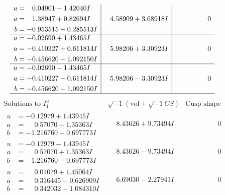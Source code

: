 \documentclass[1p]{elsarticle_modified}
\theoremstyle{definition}
\newcommand{\I}{\sqrt{-1}}
\begin{document}
$$\begin{array}{c|c|c}
\begin{aligned}
u &= \phantom{-}0.04901 - 1.42040 I \\
a &= \phantom{-}1.38947 + 0.82694 I \\
b &= -0.953515 + 0.285513 I\end{aligned}
 & \phantom{-}4.58909 + 3.68918 I & \phantom{-0.000000 } 0 \\ \hline\begin{aligned}
u &= -0.02690 + 1.43465 I \\
a &= -0.410227 + 0.611814 I \\
b &= -0.456620 + 1.092150 I\end{aligned}
 & \phantom{-}5.98206 + 3.30923 I & \phantom{-0.000000 } 0 \\ \hline\begin{aligned}
u &= -0.02690 - 1.43465 I \\
a &= -0.410227 - 0.611814 I \\
b &= -0.456620 - 1.092150 I\end{aligned}
 & \phantom{-}5.98206 - 3.30923 I & \phantom{-0.000000 } 0\\
 \hline 
 \end{array}$$\newpage$$\begin{array}{c|c|c}  
\text{Solutions to }I^u_{1}& \I (\text{vol} + \sqrt{-1}CS) & \text{Cusp shape}\\
 \hline 
\begin{aligned}
u &= -0.12979 + 1.43945 I \\
a &= \phantom{-}0.57070 - 1.35363 I \\
b &= -1.216760 - 0.697773 I\end{aligned}
 & \phantom{-}8.43626 + 9.73494 I & \phantom{-0.000000 } 0 \\ \hline\begin{aligned}
u &= -0.12979 - 1.43945 I \\
a &= \phantom{-}0.57070 + 1.35363 I \\
b &= -1.216760 + 0.697773 I\end{aligned}
 & \phantom{-}8.43626 - 9.73494 I & \phantom{-0.000000 } 0 \\ \hline\begin{aligned}
u &= \phantom{-}0.01079 + 1.45064 I \\
a &= \phantom{-}0.316445 - 0.626909 I \\
b &= \phantom{-}0.342032 - 1.084310 I\end{aligned}
 & \phantom{-}6.69030 - 2.27941 I & \phantom{-0.000000 } 0 \\ \hline\begin{aligned}

\end{aligned}
\end{array}$$
\end{document}
